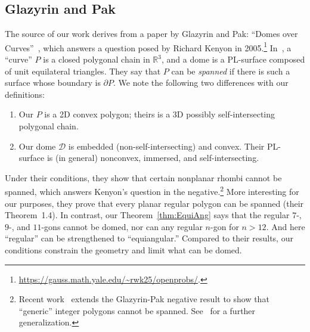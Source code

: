 \documentclass[11pt]{article}
\newcommand{\hide}[1]{}
\newcommand{\lemref}[1]{\ref{lemma:#1}}
\newcommand{\thmref}[1]{\ref{thm:#1}}
\def\D{{\mathcal D}}
\def\R{{\mathbb{R}}}
\newcommand{\JOR}[1]{{\color{red} JOR: [#1]}}
\newcommand{\Anna}[1]{{\color{red} Anna: [#1]}}
\newcommand{\anna}[1]{{\color{blue} #1}}
\begin{document}

\subsection{Glazyrin and Pak}
The source of our work derives from a paper by
Glazyrin and Pak: ``Domes over Curves''~\cite{glazyrin2022domes},
which answers a question posed by Richard Kenyon in 2005.\footnote{%
\url{https://gauss.math.yale.edu/~rwk25/openprobs/}.}
In~\cite{glazyrin2022domes}, a ``curve'' $P$ is a closed polygonal chain in $\R^3$,
and a dome is 
a PL-surface composed of unit equilateral triangles. 
They say that $P$ can be \emph{spanned}
if there is such a surface
whose boundary is $\partial P$.
We note the following two differences with our definitions:
\begin{enumerate}[(1)]
\item Our $P$ is a 2D convex polygon; theirs is a 3D possibly self-intersecting polygonal chain.
\item Our dome $\D$ is embedded (non-self-intersecting) and convex.
Their PL-surface is (in general) nonconvex, immersed, and self-intersecting.
\end{enumerate}
Under their conditions, they show that 
certain nonplanar rhombi cannot be spanned, which answers Kenyon's question in the negative.\footnote{%
Recent work~\cite{anan2024moduli}
extends the Glazyrin-Pak negative result to
show that ``generic'' integer polygons cannot be spanned. See~\cite{CobordismDomes} for a further generalization.
}
More interesting for our purposes, they prove that every planar regular polygon can be spanned
(their Theorem~1.4).
In contrast, our Theorem~\thmref{EquiAng} says that the regular $7$-, $9$-, and $11$-gons cannot
be domed, nor can any regular $n$-gon for $n>12$.
And here ``regular'' can be 
strengthened to ``equiangular.''
Compared to their results,
our conditions constrain the geometry and limit what can be domed.
\end{document}
